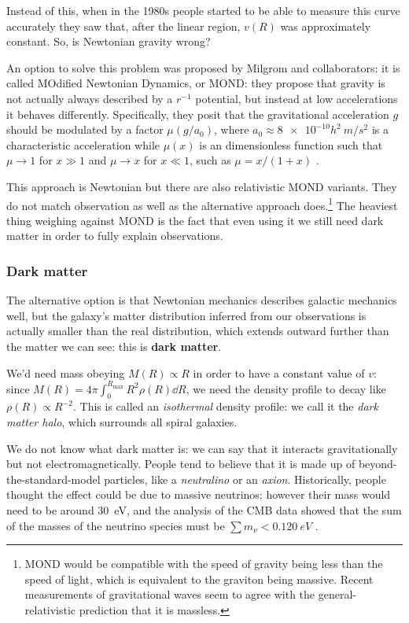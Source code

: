 \documentclass[main.tex]{subfiles}
\begin{document}
Instead of this, when in the 1980s people started to be able to measure this curve accurately they saw that, after the linear region, \(v(R)\) was approximately constant.
So, is Newtonian gravity wrong?

An option to solve this problem was proposed by Milgrom and collaborators: it is called MOdified Newtonian Dynamics, or MOND: they propose that gravity is not actually always described by a \(r^{-1}\) potential, but instead at low accelerations it behaves differently.
Specifically, they posit that the gravitational acceleration \(g\) should be modulated by a factor \(\mu (g / a_0 )\), where \(a_0 \approx \num{8e-10} h^2 \SI{}{m /s^2}\) is a characteristic acceleration while \(\mu (x)\) is an dimensionless function such that \(\mu \rightarrow 1\) for \(x \gg 1\) and \(\mu \rightarrow x\) for \(x \ll 1\), such as \(\mu = x / (1+x)\) \cite{bekensteinDoesMissingMass1984}.

This approach is Newtonian but there are also relativistic MOND variants. They do not match observation as well as the alternative approach does.\footnote{MOND would be compatible with the speed of gravity being less than the speed of light, which is equivalent to the graviton being massive. Recent measurements of gravitational waves seem to agree with the general-relativistic prediction that it is massless.}
The heaviest thing weighing against MOND is the fact that even using it we still need dark matter in order to fully explain observations.

\subsubsection{Dark matter}

The alternative option is that Newtonian mechanics describes galactic mechanics well, but the galaxy's matter distribution inferred from our observations is actually smaller than the real distribution, which extends outward further than the matter we can see: this is \textbf{dark matter}.

We'd need mass obeying \(M (R) \propto R\) in order to have a constant value of \(v\): since \(M(R) = 4 \pi \int_0^{R_{\text{max}}}  R^2 \rho(R) \dd{R}\), we need the density profile to decay like \(\rho(R) \propto R^{-2}\).
This is called an \emph{isothermal} density profile: we call it the \emph{dark matter halo}, which surrounds all spiral galaxies.

We do not know what dark matter is: we can say that it   interacts gravitationally but not electromagnetically.
People tend to believe that it is made up of beyond-the-standard-model particles, like a \emph{neutralino} or an \emph{axion}.
Historically, people thought the effect could be due to massive neutrinos; however their mass would need to be around \SI{30}{eV}, and the analysis of the CMB data showed that the sum of the masses of the neutrino species must be \(\sum m_\nu < \SI{0.120}{eV}\) \cite[Table 7]{PlanckCollaboration:2018I}.
\end{document}
